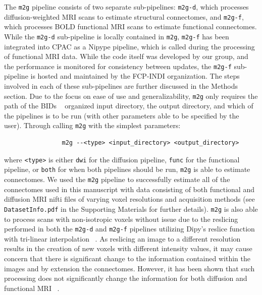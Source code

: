 The \texttt{m2g} pipeline consists of two separate sub-pipelines: \texttt{m2g-d}, which processes diffusion-weighted MRI scans to estimate structural connectomes, and \texttt{m2g-f}, which processes BOLD functional MRI scans to estimate functional connectomes. While the \texttt{m2g-d} sub-pipeline is locally contained in \texttt{m2g}, \texttt{m2g-f} has been integrated into CPAC \cite{cpac} as a Nipype pipeline, \cite{nypipe} which is called during the processing of functional MRI data. While the code itself was developed by our group, and the performance is monitored for consistency between updates, the \texttt{m2g-f} sub-pipeline is hosted and maintained by the FCP-INDI organization. The steps involved in each of these sub-pipelines are further discussed in the Methods section. Due to the focus on ease of use and generalizability, \texttt{m2g} only requires the path of the BIDs ~\cite{bidspec} organized input directory, the output directory, and which of the pipelines is to be run (with other parameters able to be specified by the user). Through calling \texttt{m2g} with the simplest parameters:
\begin{verbatim}
                m2g --<type> <input_directory> <output_directory>
\end{verbatim}
where  \texttt{<type>} is either \texttt{dwi} for the diffusion pipeline, \texttt{func} for the functional pipeline, or \texttt{both} for when both pipelines should be run, \texttt{m2g} is able to estimate connectomes. We used the \texttt{m2g} pipeline to successfully estimate all of the connectomes used in this manuscript with data consisting of both functional and diffusion MRI nifti files of varying voxel resolutions and acquisition methods (see \texttt{DatasetInfo.pdf} in the Supporting Materials for further details). 
\texttt{m2g} is also able to process scans with non-isotropic voxels without issue due to the reslicing performed in both the \texttt{m2g-d} and \texttt{m2g-f} pipelines utilizing Dipy's reslice function with tri-linear interpolation ~\cite{dipy}. As reslicing an image to a different resolution results in the creation of new voxels with different intensity values, it may cause concern that there is significant change to  the information contained within the images and by extension the connectomes. However, it has been shown that such processing does not significantly change the information for both diffusion and functional MRI ~\cite{trilin1,trilin2}.

